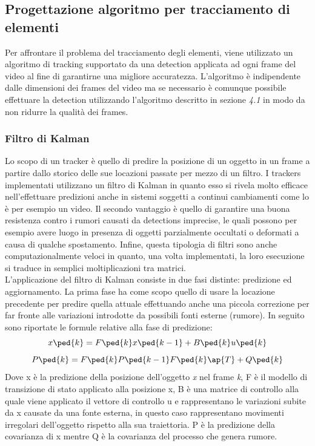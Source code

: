 \subsection{Progettazione algoritmo per tracciamento di elementi}
Per affrontare il problema del tracciamento degli elementi, viene utilizzato un algoritmo di tracking supportato da una detection applicata ad ogni frame del video al fine di garantirne una migliore accuratezza\cite{trackingdetection}. L'algoritmo è indipendente dalle dimensioni dei frames del video ma se necessario è comunque possibile effettuare la detection utilizzando l'algoritmo descritto in sezione \textit{4.1} in modo da non ridurre la qualità dei frames.
\subsubsection{Filtro di Kalman}
Lo scopo di un tracker è quello di predire la posizione di un oggetto in un frame a partire dallo storico delle sue locazioni passate per mezzo di un filtro. I trackers implementati utilizzano un filtro di Kalman\cite{kalman} in quanto esso si rivela molto efficace nell'effettuare predizioni anche in sistemi soggetti a continui cambiamenti come lo è per esempio un video. Il secondo vantaggio è quello di garantire una buona resistenza contro i rumori causati da detections imprecise, le quali possono per esempio avere luogo in presenza di oggetti parzialmente occultati o deformati a causa di qualche spostamento. Infine, questa tipologia di filtri sono anche computazionalmente veloci in quanto, una volta implementati, la loro esecuzione si traduce in semplici moltiplicazioni tra matrici.\\
L'applicazione del filtro di Kalman consiste in due fasi distinte: predizione ed aggiornamento. La prima fase ha come scopo quello di usare la locazione precedente per predire quella attuale effettuando anche una piccola correzione per far fronte alle variazioni introdotte da possibili fonti esterne (rumore). In seguito sono riportate le formule relative alla fase di predizione:
\[
    x\ped{k} = F\ped{k}x\ped{k-1} + B\ped{k}u\ped{k}
\]
\[
    P\ped{k} = F\ped{k}P\ped{k-1}F\ped{k}\ap{T} + Q\ped{k}
\]
Dove x è la predizione della posizione dell'oggetto \textit{x} nel frame \textit{k}, F è il modello di transizione di stato applicato alla posizione x, B è una matrice di controllo alla quale viene applicato il vettore di controllo u e rappresentano le variazioni subite da x causate da una fonte esterna, in questo caso rappresentano movimenti irregolari dell'oggetto rispetto alla sua traiettoria. P è la predizione della covarianza di x mentre Q è la covarianza del processo che genera rumore.\\
